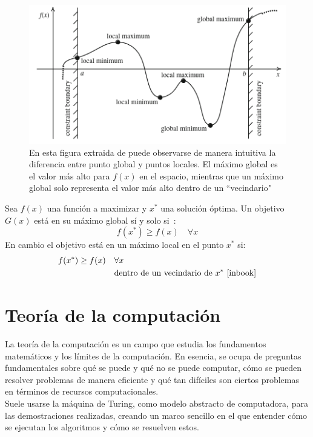 \begin{figure}[H]
    \begin{center}
        \includegraphics[width=1\textwidth]{imagenes/min-max_points.png}
    \end{center}
    \caption[Puntos globales y locales]{En esta figura extraida de \cite{inbook} puede observarse de manera intuitiva la diferencia entre punto global y puntos locales. El máximo global es el valor más alto para $f(x)$ en el espacio, mientras que un máximo global solo representa el valor más alto dentro de un ``vecindario"}
\end{figure}

Sea $f(x)$ una función a maximizar y $x^*$ una solución óptima. Un objetivo $G(x)$ está en su máximo global sí y solo si~\cite{inbook}:
\begin{equation}
    f(x^*) \geq f(x) \quad \forall x
\end{equation}
En cambio el objetivo está en un máximo local en el punto $x^*$ si:
\begin{equation}
    \begin{split}
        f(x^*) \geq f(x) \quad & \forall x \\
        & \text{dentro de un vecindario de } x^*\text{~\cite{inbook}}
    \end{split}
\end{equation}

\section{Teoría de la computación}
La teoría de la computación es un campo que estudia los fundamentos matemáticos y los límites de la computación. En esencia, se ocupa de preguntas fundamentales sobre qué se puede y qué no se puede computar, cómo se pueden resolver problemas de manera eficiente y qué tan difíciles son ciertos problemas en términos de recursos computacionales.\\[6pt]
Suele usarse la máquina de Turing, como modelo abstracto de computadora, para las demostraciones realizadas, creando un marco sencillo en el que entender cómo se ejecutan los algoritmos y cómo se resuelven estos.
